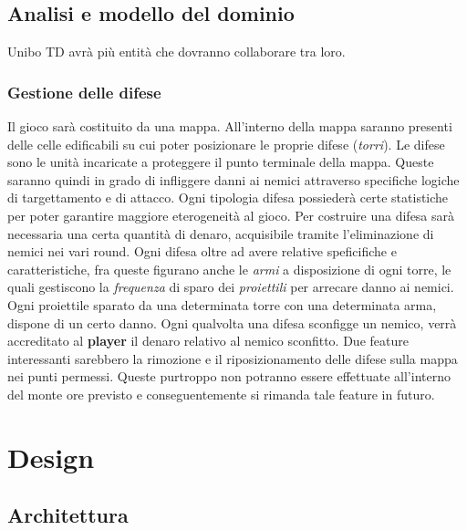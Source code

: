 \documentclass[a4paper,12pt]{report}
\begin{document}
\section{Analisi e modello del dominio}

Unibo TD avrà più entità che dovranno collaborare tra loro.

\subsection*{Gestione delle difese}
\begin{itemize}
Il gioco sarà costituito da una mappa. All'interno della mappa saranno presenti delle celle edificabili su cui poter posizionare le proprie difese (\textit{torri}). 
Le difese sono le unità incaricate a proteggere il punto terminale della mappa. Queste saranno quindi in grado di infliggere danni ai nemici attraverso specifiche logiche di targettamento e di attacco. Ogni tipologia difesa possiederà certe statistiche per poter garantire maggiore eterogeneità al gioco. Per costruire una difesa sarà necessaria una certa quantità di denaro, acquisibile tramite l'eliminazione di nemici nei vari round. Ogni difesa oltre ad avere relative speficifiche e caratteristiche, fra queste figurano anche le \textit{armi} a disposizione di ogni torre, le quali gestiscono la \textit{frequenza} di sparo dei \textit{proiettili} per arrecare danno ai nemici. Ogni proiettile sparato da una determinata torre con una determinata arma, dispone di un certo danno. Ogni qualvolta una difesa sconfigge un nemico, verrà accreditato al \textbf{player} il denaro relativo al nemico sconfitto. Due feature interessanti sarebbero la rimozione e il riposizionamento delle difese sulla mappa nei punti permessi. Queste purtroppo non potranno essere effettuate all’interno del monte ore previsto e conseguentemente si rimanda tale feature in futuro.
\end{itemize}

\chapter{Design}

\section{Architettura}
\end{document}
